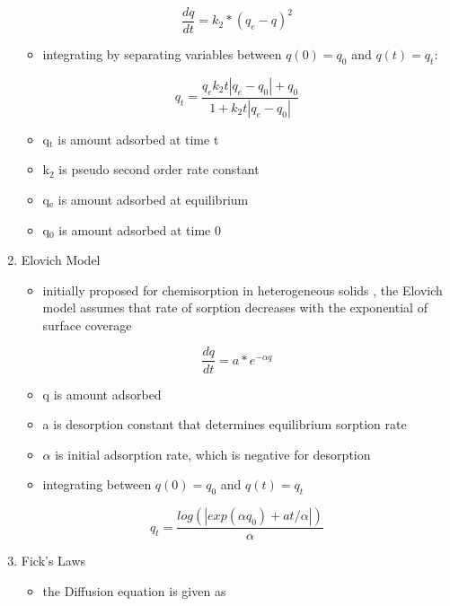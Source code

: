 \documentclass[11pt]{article}
\begin{document}
\begin{enumerate}
\begin{equation}
\frac{dq}{dt} = k_2 * (q_e - q)^2
\end{equation}
\begin{itemize}
\item integrating by separating variables between \(q(0) = q_0\) and \(q(t) = q_t\):
\end{itemize}
\begin{equation}
q_t = \frac{q_e k_2 t |q_e - q_0| + q_0}{1 + k_2 t |q_e - q_0|}
\end{equation}
\begin{itemize}
\item q\(_{\text{t}}\) is amount adsorbed at time t
\item k\(_{\text{2}}\) is pseudo second order rate constant
\item q\(_{\text{e}}\) is amount adsorbed at equilibrium
\item q\(_{\text{0}}\) is amount adsorbed at time 0
\end{itemize}
\item Elovich Model
\label{sec:org5fc899f}
\begin{itemize}
\item initially proposed for chemisorption in heterogeneous solids \cite{Qiu2009}, the Elovich model assumes that rate of sorption decreases with the exponential of surface coverage
\end{itemize}
\begin{equation}
\frac{dq}{dt} = a * e ^{-\alpha q}
\end{equation}
\begin{itemize}
\item q is amount adsorbed
\item a is desorption constant that determines equilibrium sorption rate
\item \(\alpha\) is initial adsorption rate, which is negative for desorption
\end{itemize}
\begin{itemize}
\item integrating between \(q(0) = q_0\) and \(q(t) = q_t\)
\end{itemize}
\begin{equation}
q_t = \frac{log(| exp(\alpha q_0) + a t / \alpha |)}{\alpha}
\end{equation}  
\item Fick's Laws
\label{sec:org6cc4b7c}
\begin{itemize}
\item the Diffusion equation is given as \cite{Crank1979}
\end{itemize}

\end{enumerate}
\end{document}
